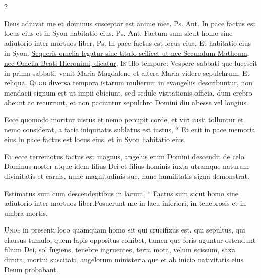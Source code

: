 \begin{multicols*}{2}
\begin{responsory}
\end{responsory}%
 Deus adiuvat me et dominus susceptor est anime mee. {\color{Red} Ps.}  {\color{Red} Ant.} In pace factus est locus eius et in Syon habitatio eius. {\color{Red} Ps.}  {\color{Red} Ant.} Factum sum sicut homo sine adiutorio inter mortuos liber. {\color{Red} Ps.}  \V In pace factus est locus eius. \R Et habitatio eius in Syon.
\newline \ul{Sequeris omelia legatur sine titulo scilicet ut nec Secundum Matheum, nec Omelia Beati Hieronimi, dicatur,}
\lettrine[lines=2]{\zallmancaps \color{Blue} I}{n} illo tempore: Vespere sabbati que lucescit in prima sabbati, venit Maria Magdalene et altera Maria videre sepulchrum. Et reliqua.
\lettrine[lines=2]{\zallmancaps \color{Red} Q}{uod} diversa tempora istarum mulierum in evangeliis describuntur, non mendacii signum est ut impii obiciunt, sed sedule visitationis officia, dum crebro abeunt ac recurrunt, et non paciuntur sepulchro Domini diu abesse vel longius.
\begin{responsory}
{Ecce quomodo moritur iustus et nemo percipit corde, et viri iusti tolluntur et nemo considerat, a facie iniquitatis sublatus est iustus, * Et erit in pace memoria eius.}{In pace factus est locus eius, et in Syon habitatio eius.}
\end{responsory}%
\lettrine[lines=2]{\zallmancaps \color{Blue} E}{t} ecce terremotus factus est magnus, angelus enim Domini descendit de celo. Dominus noster atque idem filius Dei et filius hominis iuxta utramque naturam divinitatis et carnis, nunc magnitudinis sue, nunc humilitatis signa demonstrat.
\begin{responsory}
{Estimatus sum cum descendentibus in lacum, * Factus sum sicut homo sine adiutorio inter mortuos liber.}{Posuerunt me in lacu inferiori, in tenebrosis et in umbra mortis.}
\end{responsory}%
\lettrine[lines=2]{\zallmancaps \color{Red} U}{nde} in presenti loco quamquam homo sit qui crucifixus est, qui sepultus, qui clausus tumulo, quem lapis oppositus cohibet, tamen que foris aguntur ostendunt filium Dei, sol fugiens, tenebre ingruentes, terra mota, velum scissum, saxa diruta, mortui suscitati, angelorum ministeria que et ab inicio nativitatis eius Deum probabant.

\end{multicols*}
